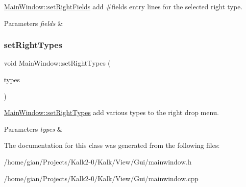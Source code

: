 \hyperlink{class_main_window_a8cbaa03b855c6ab3bb7a910662346549}{Main\+Window\+::set\+Right\+Fields} add \#fields entry lines for the selected right type. 


\begin{DoxyParams}{Parameters}
{\em fields} & \\
\hline
\end{DoxyParams}
\mbox{\label{class_main_window_aca464c6893a9551372c043cb3bf7bf56}} 
\subsubsection{\texorpdfstring{set\+Right\+Types}{setRightTypes}}
{\footnotesize\ttfamily void Main\+Window\+::set\+Right\+Types (\begin{DoxyParamCaption}\item[{const Q\+Vector$<$ Q\+String $>$}]{types }\end{DoxyParamCaption})\hspace{0.3cm}{\ttfamily [slot]}}



\hyperlink{class_main_window_aca464c6893a9551372c043cb3bf7bf56}{Main\+Window\+::set\+Right\+Types} add various types to the right drop menu. 


\begin{DoxyParams}{Parameters}
{\em types} & \\
\hline
\end{DoxyParams}


The documentation for this class was generated from the following files\+:\begin{DoxyCompactItemize}
\item 
/home/gian/\+Projects/\+Kalk2-\/0/\+Kalk/\+View/\+Gui/mainwindow.\+h\item 
/home/gian/\+Projects/\+Kalk2-\/0/\+Kalk/\+View/\+Gui/mainwindow.\+cpp\end{DoxyCompactItemize}
